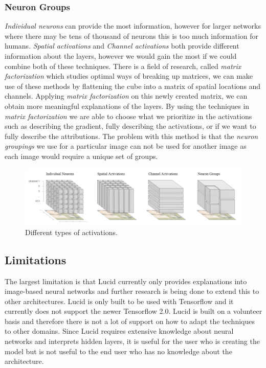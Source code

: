 \subsubsection{Neuron Groups}
\emph{Individual neurons} can provide the most information, however for larger networks where there may be tens of thousand of neurons this is too much information for humans. \emph{Spatial activations} and \emph{Channel activations} both provide different information about the layers, however we would gain the most if we could combine both of these techniques. There is a field of research, called \emph{matrix factorization} which studies optimal ways of breaking up matrices, we can make use of these methods by flattening the cube into a matrix of spatial locations and channels. Applying \emph{matrix factorization} on this newly created matrix, we can obtain more meaningful explanations of the layers.  By using the techniques in \emph{matrix factorization} we are able to choose what we prioritize in the activations such as describing the gradient, fully describing the activations, or if we want to fully describe the attributions. The problem with this method is that the \emph{neuron groupings} we use for a particular image can not be used for another image as each image would require a unique set of groups. 
\begin  {figure}[!htpb]
  \includegraphics[width=\linewidth]{Evaluation_Images/LUCID_maps.png}
  \caption{Different types of activations. \cite{olah2018the}}
  \label{fig:lucid-maps}
\end{figure}




\subsection{Limitations}
The largest limitation is that Lucid currently only provides explanations into image-based neural networks and further research is being done to extend this to other architectures. Lucid is only built to be used with Tensorflow and it currently does not support the newer Tensorflow 2.0. Lucid is built on a volunteer basis and therefore there is not a lot of support on how to adapt the techniques to other domains. Since Lucid requires extensive knowledge about neural networks and interprets hidden layers, it is useful for the user who is creating the model but is not useful to the end user who has no knowledge about the architecture.
